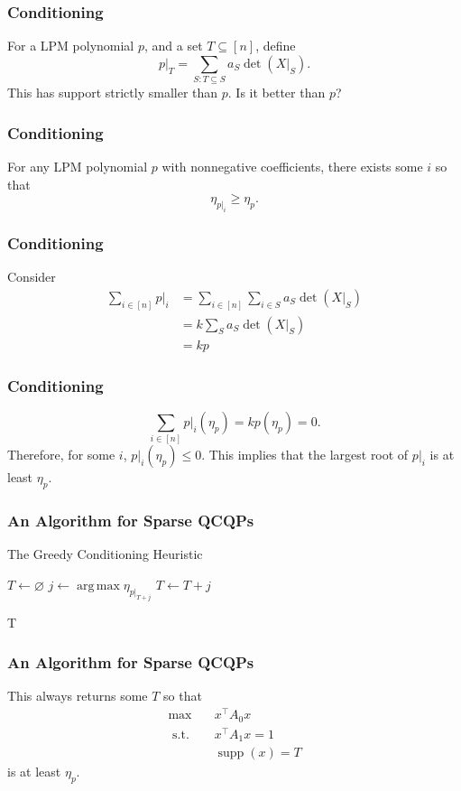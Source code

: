 \documentclass{beamer}
\DeclareMathOperator*{\argmax}{arg\,max}
\DeclareMathOperator*{\supp}{supp}
\newcommand{\st}{{\text{ s.t. }}}
\begin{document}
\begin{frame}
    \frametitle{Conditioning}
    For a LPM polynomial $p$, and a set $T \subseteq [n]$, define
    \[
        p|_T = \sum_{S : T \subseteq S} a_S \det(X|_S).
    \]
    This has support strictly smaller than $p$. Is it better than $p$?
\end{frame}
\begin{frame}
    \frametitle{Conditioning}
    \begin{theorem}
    For any LPM polynomial $p$ with nonnegative coefficients, there exists some $i$ so that
    \[
        \eta_{p|_i} \ge \eta_{p}.
    \]
    \end{theorem}
\end{frame}
\begin{frame}
    \frametitle{Conditioning}
    Consider
        \begin{align*} 
        \sum_{i \in [n]} p|_{i}&=\sum_{i \in [n]} \sum_{i \in  S} a_S \det(X|_S)\\
                &=k\sum_{S} a_S \det(X|_S)\\
                &=kp
        \end{align*}
\end{frame}
\begin{frame}
    \frametitle{Conditioning}
    \[
        \sum_{i\in [n]}p|_i(\eta_p) = kp(\eta_p) = 0.
    \]
    \pause
    Therefore, for some $i$, $ p|_{i}(\eta_{p}) \le 0$.
    \pause
    This implies that the largest root of $p|_{i}$ is at least $\eta_{p}$.
\end{frame}
\begin{frame}
    \begin{algorithm}[H]
    \frametitle{An Algorithm for Sparse QCQPs}
    \caption{The Greedy Conditioning Heuristic}
    \label{alg:greedy}
    \begin{algorithmic}
        \State $T \gets \varnothing$
            \State $j \gets \argmax \eta_{p|_{T + j}}$
            \State $T \gets T + j$
        \EndFor

        \Return T
    \end{algorithmic}
    \end{algorithm}
\end{frame}
\begin{frame}
    \frametitle{An Algorithm for Sparse QCQPs}
    
This always returns some $T$ so that 
\begin{equation}
    \begin{aligned}
        \max\quad & x^{\intercal}A_0x\\
        \st & x^{\intercal}A_1x = 1\\
            & \supp(x) = T
    \end{aligned}
\end{equation}
is at least $\eta_p$.
\end{frame}
\end{document}
